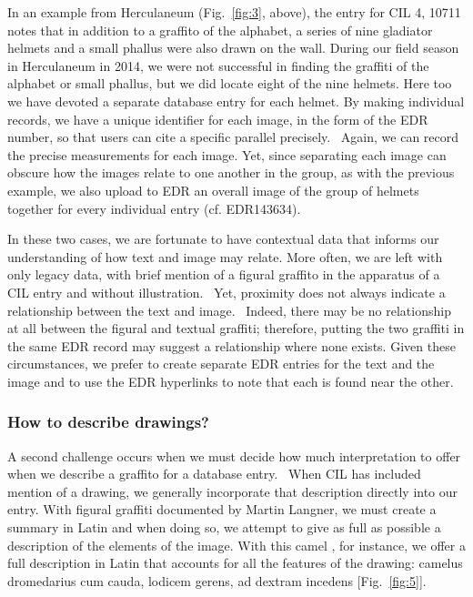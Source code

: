 \documentclass[amsthm,ebook]{saparticle}
\begin{document}
In an example from Herculaneum (Fig.~\ref{fig:3}, above), the entry for CIL 4, 10711 notes that in addition to a graffito of the
alphabet, a series of nine gladiator helmets and a small phallus were also drawn on the wall. During our field season
in Herculaneum in 2014, we were not successful in finding the graffiti of the alphabet or small phallus, but we did
locate eight of the nine helmets. Here too we have devoted a separate database entry for each helmet. By making
individual records, we have a unique identifier for each image, in the form of the EDR number, so that users can cite a
specific parallel precisely. \ Again, we can record the precise measurements for each image. Yet, since separating
each image can obscure how the images relate to one another in the group, as with the previous example, we also upload
to EDR an overall image of the group of helmets together for every individual entry (cf. EDR143634).

In these two cases, we are fortunate to have contextual data that informs our understanding of how text and image may
relate. More often, we are left with only legacy data, with brief mention of a figural graffito in the apparatus of a
CIL entry and without illustration. \ Yet, proximity does not always indicate a relationship between the text and
image. \ Indeed, there may be no relationship at all between the figural and textual graffiti; therefore, putting the
two graffiti in the same EDR record may suggest a relationship where none exists. Given these circumstances, we prefer
to create separate EDR entries for the text and the image and to use the EDR hyperlinks to note that each is found near
the other.




\subsubsection{How to describe drawings? }


A second challenge occurs when we must decide how much interpretation to offer when we describe a graffito for a
database entry. \ When CIL has included mention of a drawing, we generally incorporate that description directly into
our entry. With figural graffiti documented by Martin Langner, we must create a summary in Latin and when doing so, we
attempt to give as full as possible a description of the elements of the image. With this camel \citep[n. 1443]{langner_antike_2001}, for instance, we offer a full description in Latin that accounts for all the features of the drawing: camelus
dromedarius cum cauda, lodicem gerens, ad dextram incedens [Fig.~\ref{fig:5}].
\end{document}
